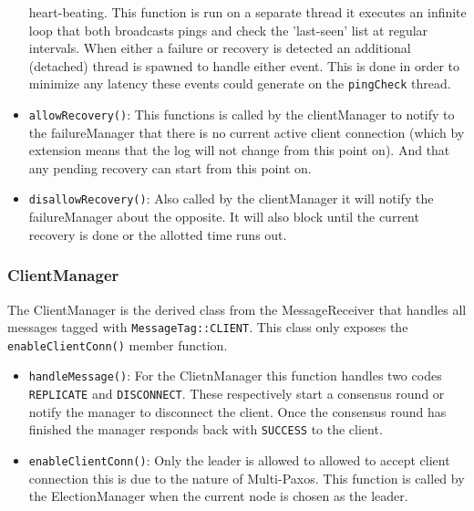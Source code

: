 \documentclass[11pt]{article}
\begin{document}
\begin{itemize}
  heart-beating. This function is run on a separate thread it executes an infinite
  loop that both broadcasts pings and check the 'last-seen' list at regular
  intervals. When either a failure or recovery is detected an additional
  (detached) thread is spawned to handle either event. This is done in order to
  minimize any latency these events could generate on the \texttt{pingCheck}
  thread.\\
\item \texttt{allowRecovery()}: This functions is called by the clientManager to
  notify to the failureManager that there is no current active client connection
  (which by extension means that the log will not change from this point
  on). And that any pending recovery can start from this point on.\\
\item \texttt{disallowRecovery()}: Also called by the clientManager it will
  notify the failureManager about the opposite. It will also block until the
  current recovery is done or the allotted time runs out.
\end{itemize}
\subsubsection{ClientManager}
The ClientManager is the derived class from the MessageReceiver that handles all
messages tagged with \texttt{MessageTag::CLIENT}. This class only exposes the
\texttt{enableClientConn()} member function.\\
\begin{itemize}
  \item \texttt{handleMessage()}: For the ClietnManager this function handles
    two codes \texttt{REPLICATE} and \texttt{DISCONNECT}. These respectively
    start a consensus round or notify the manager to disconnect the client. Once
    the consensus round has finished the manager responds back with
    \texttt{SUCCESS} to the client.\\
  \item \texttt{enableClientConn()}: Only the leader is allowed to allowed to
    accept client connection this is due to the nature of Multi-Paxos. This
    function is called by the ElectionManager when the current node is chosen as
    the leader.\\
\end{itemize}
\end{document}
